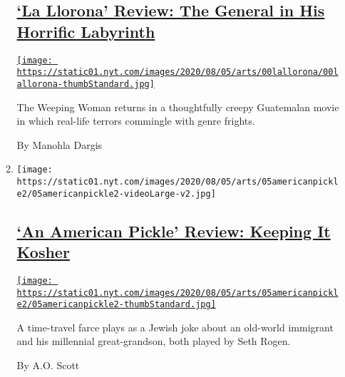 \begin{enumerate}
\begin{enumerate}
    \hypertarget{la-llorona-review-the-general-in-his-horrific-labyrinth}{%
    \subsection{\texorpdfstring{\href{/2020/08/05/movies/la-llorona-review.html}{`La
    Llorona' Review: The General in His Horrific
    Labyrinth}}{`La Llorona' Review: The General in His Horrific Labyrinth}}\label{la-llorona-review-the-general-in-his-horrific-labyrinth}}

    \href{/2020/08/05/movies/la-llorona-review.html}{\texttt{[image: https://static01.nyt.com/images/2020/08/05/arts/00lallorona/00lallorona-thumbStandard.jpg]}}

    The Weeping Woman returns in a thoughtfully creepy Guatemalan movie
    in which real-life terrors commingle with genre frights.

    By Manohla Dargis
  \item
    \texttt{[image: https://static01.nyt.com/images/2020/08/05/arts/05americanpickle2/05americanpickle2-videoLarge-v2.jpg]}

    \hypertarget{an-american-pickle-review-keeping-it-kosher}{%
    \subsection{\texorpdfstring{\href{/2020/08/04/movies/an-american-pickle-review.html}{`An
    American Pickle' Review: Keeping It
    Kosher}}{`An American Pickle' Review: Keeping It Kosher}}\label{an-american-pickle-review-keeping-it-kosher}}

    \href{/2020/08/04/movies/an-american-pickle-review.html}{\texttt{[image: https://static01.nyt.com/images/2020/08/05/arts/05americanpickle2/05americanpickle2-thumbStandard.jpg]}}

    A time-travel farce plays as a Jewish joke about an old-world
    immigrant and his millennial great-grandson, both played by Seth
    Rogen.

    By A.O. Scott
  \end{enumerate}
\end{enumerate}

